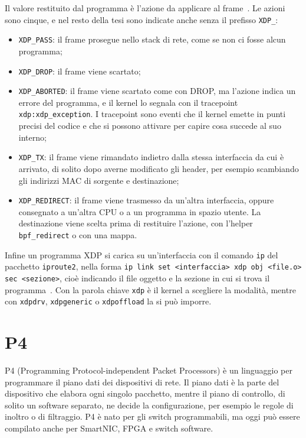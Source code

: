 Il valore restituito dal programma è l'azione da applicare al frame~\cite{ebpf-docs-xdp}. Le azioni sono cinque, e nel resto della tesi sono indicate anche senza il prefisso \texttt{XDP\_}:
\begin{itemize}
    \item \texttt{XDP\_PASS}: il frame prosegue nello stack di rete, come se non ci fosse alcun programma;
    \item \texttt{XDP\_DROP}: il frame viene scartato;
    \item \texttt{XDP\_ABORTED}: il frame viene scartato come con DROP, ma l'azione indica un errore del programma, e il kernel lo segnala con il tracepoint \texttt{xdp:xdp\_exception}. I tracepoint sono eventi che il kernel emette in punti precisi del codice e che si possono attivare per capire cosa succede al suo interno;
    \item \texttt{XDP\_TX}: il frame viene rimandato indietro dalla stessa interfaccia da cui è arrivato, di solito dopo averne modificato gli header, per esempio scambiando gli indirizzi MAC di sorgente e destinazione;
    \item \texttt{XDP\_REDIRECT}: il frame viene trasmesso da un'altra interfaccia, oppure consegnato a un'altra CPU o a un programma in spazio utente. La destinazione viene scelta prima di restituire l'azione, con l'helper \texttt{bpf\_redirect} o con una mappa.
\end{itemize}

Infine un programma XDP si carica su un'interfaccia con il comando \texttt{ip} del pacchetto \texttt{iproute2}, nella forma \texttt{ip link set <interfaccia> xdp obj <file.o> sec <sezione>}, cioè indicando il file oggetto e la sezione in cui si trova il programma~\cite{cilium-bpf}. Con la parola chiave \texttt{xdp} è il kernel a scegliere la modalità, mentre con \texttt{xdpdrv}, \texttt{xdpgeneric} o \texttt{xdpoffload} la si può imporre.

\section{P4}\label{sec:p4}

P4 (Programming Protocol-independent Packet Processors) è un linguaggio per programmare il piano dati dei dispositivi di rete. Il piano dati è la parte del dispositivo che elabora ogni singolo pacchetto, mentre il piano di controllo, di solito un software separato, ne decide la configurazione, per esempio le regole di inoltro o di filtraggio. P4 è nato per gli switch programmabili, ma oggi può essere compilato anche per SmartNIC, FPGA e switch software.

